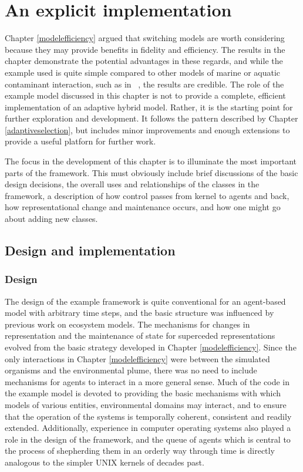 

\chapter[AN EXPLICIT IMPLEMENTATION]{An explicit implementation}
\WeAreOn{\cfive}\label{explicitmodel}

Chapter \ref{modelefficiency} argued that switching models are worth
considering because they may provide benefits in fidelity and
efficiency. The results in the chapter demonstrate the potential
advantages in these regards, and while the example used is quite
simple compared to other models of marine or aquatic contaminant
interaction, such as in ~\cite{Gray2006nws, Gray2014}, the results are
credible.  The role of the example model discussed in this chapter is
not to provide a complete, efficient implementation of an adaptive
hybrid model.  Rather, it is the starting point for further
exploration and development.  It follows the pattern described by
Chapter \ref{adaptiveselection}, but includes minor improvements and
enough extensions to provide a useful platforn for further work.

The focus in the development of this chapter is to illuminate the most
important parts of the framework. This must obviously include brief
discussions of the basic design decisions, the overall uses and
relationships of the classes in the framework, a description of how
control passes from kernel to agents and back, how representational
change and maintenance occurs, and how one might go about adding new
classes. 

\section{Design and implementation}
\subsection{Design}
The design of the example framework is quite conventional for an
agent-based model with arbitrary time steps, and the basic structure
was influenced by previous work on ecosystem models. The mechanisms
for changes in representation and the maintenance of state for
superceded representations evolved from the basic strategy developed
in Chapter \ref{modelefficiency}.  Since the only interactions in
Chapter \ref{modelefficiency} were between the simulated organisms and
the environmental plume, there was no need to include mechanisms for
agents to interact in a more general sense. Much of the code in the
example model is devoted to providing the basic mechanisms with which
models of various entities, environmental domains may interact, and to
ensure that the operation of the systems is temporally coherent,
consistent and readily extended. Additionally, experience in computer
operating systems also played a role in the design of the framework,
and the queue of agents which is central to the process of shepherding
them in an orderly way through time is directly analogous to the
simpler UNIX kernels of decades past.


